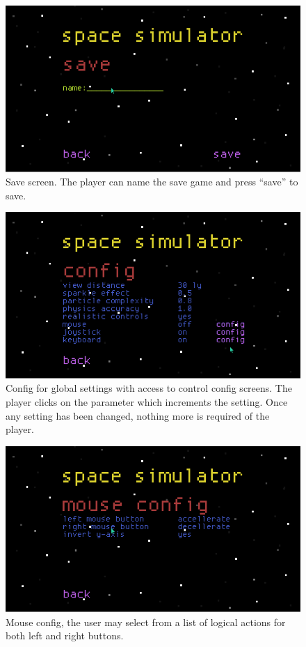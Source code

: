 \begin{figure}[H]
  \centering
  \includegraphics[scale=0.5]{../images/04-save.png}
  \caption{Save screen.  The player can name the save game and press ``save'' to save.}
\end{figure}

\begin{figure}[H]
  \centering
  \includegraphics[scale=0.5]{../images/05-config.png}
  \caption{Config for global settings with access to control config screens.  The player clicks on the parameter which increments the setting.  Once any setting has been changed, nothing more is required of the player.}
\end{figure}

\begin{figure}[H]
  \centering
  \includegraphics[scale=0.5]{../images/06-mouse_config.png}
  \caption{Mouse config, the user may select from a list of logical actions for both left and right buttons.}
\end{figure}

